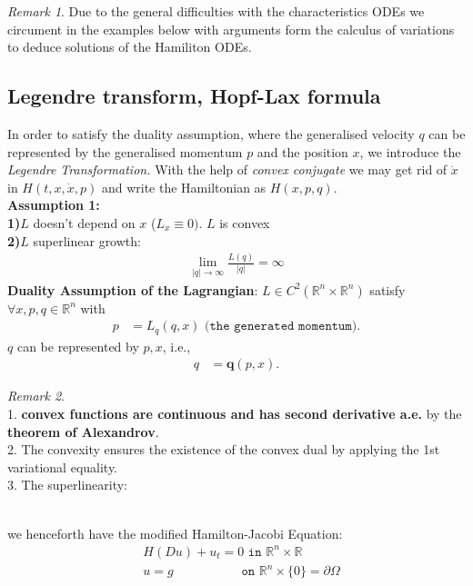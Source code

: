 \documentclass[a4paper,11pt,oneside,fleqn]{book}
\theoremstyle{definition}
\theoremstyle{remark}
\newtheorem*{remark}{Remark}
\begin{document}
\begin{remark}
Due to the general difficulties with the characteristics ODEs we circument in the examples below with arguments form the calculus of variations to deduce solutions of the Hamiliton ODEs. 	
\end{remark}


\subsection{Legendre transform, Hopf-Lax formula}
In order to satisfy the duality assumption, where the generalised velocity $q$ can be represented by the generalised momentum $p$ and the position $x$, we introduce the \textit{Legendre Transformation.} With the help of \textit{convex conjugate} we may get rid of $\dot{x}$ in $H(t, x, \dot{x}, p)$ and write the Hamiltonian as $H(x, p, q)$.   \\
\textbf{Assumption 1:}\\
\textbf{1)}$L$ doesn't depend on $x$ ($L_x \equiv 0)$. $L$ is convex\\
\textbf{2)}$L$ superlinear growth:
\begin{align*}
	\lim_{|q| \rightarrow \infty} \frac{L(q)}{|q|} = \infty
\end{align*}
\textbf{Duality Assumption of the Lagrangian}: $L \in C^2(\mathbb{R}^n \times \mathbb{R}^n)$ satisfy $\forall x , p, q \in \mathbb{R}^n$ with
\begin{align*}
	p &= L_q(q, x)\texttt{ (the generated momentum)}.
\end{align*}
$q$ can be represented by $p, x$, i.e., 
\begin{align*}
	q &= \textbf{q}(p, x).
\end{align*}
\begin{remark}\quad\\
1. \textbf{convex functions are continuous and has second derivative a.e.} by the \textbf{theorem of Alexandrov}.	\\
2. The convexity ensures the existence of the convex dual by applying the 1st variational equality. \\
3. The superlinearity:
\end{remark}
\quad\\
we henceforth have the modified Hamilton-Jacobi Equation:
\begin{align*}
	&H(Du) + u_t = 0 \texttt{ in } \mathbb{R}^n \times \mathbb{R}\\
	&u = g \qquad \qquad \quad \texttt{ on } \mathbb{R}^n \times \{0\} = \partial\Omega
\end{align*}
\end{document}

